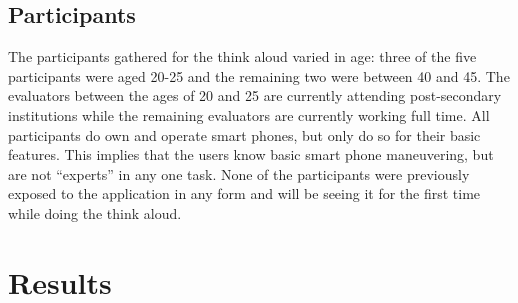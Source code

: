 \documentclass[pdftex,12pt,a4paper]{report}
\begin{document}
\section{Participants}
The participants gathered for the think aloud varied in age: three of the five participants were aged 20-25 and the remaining two were between 40 and 45. The evaluators between the ages of 20 and 25 are currently attending post-secondary institutions while the remaining evaluators are currently working full time. All participants do own and operate smart phones, but only do so for their basic features. This implies that the users know basic smart phone maneuvering, but are not ``experts'' in any one task. None of the participants were previously exposed to the application in any form and will be seeing it for the first time while doing the think aloud.\\

\chapter{Results}
\end{document}
